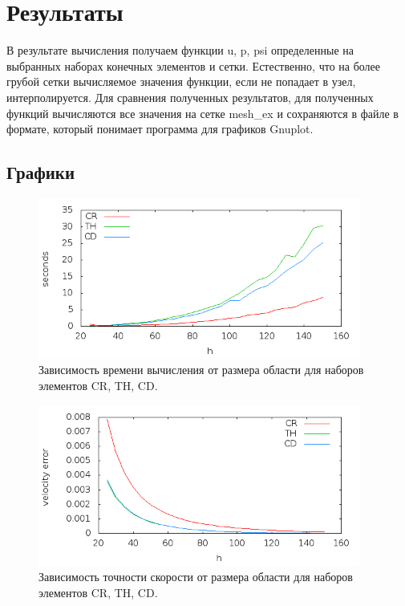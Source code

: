 \documentclass[12pt]{article}
\begin{document}
\section{Результаты}
В результате вычисления получаем функции u, p, psi определенные на выбранных наборах конечных элементов и сетки. Естественно, что на более грубой сетки вычисляемое значения функции, если не попадает в узел, интерполируется. Для сравнения полученных результатов, для полученных функций вычисляются все значения на сетке mesh\_ex и сохраняются в файле в формате, который понимает программа для графиков Gnuplot.

\subsection{Графики}
\begin{figure}
	\begin{center}
		\includegraphics[width=400px]{pics/time}
		\caption{Зависимость времени вычисления от размера области для наборов элементов CR, TH, CD.}
		\label{fg:time}
	\end{center}
\end{figure}

\begin{figure}
	\begin{center}
		\includegraphics[width=400px]{pics/u_err}
		\caption{Зависимость точности скорости от размера области для наборов элементов CR, TH, CD.}
		\label{fg:u_err}
	\end{center}
\end{figure}
\end{document}
